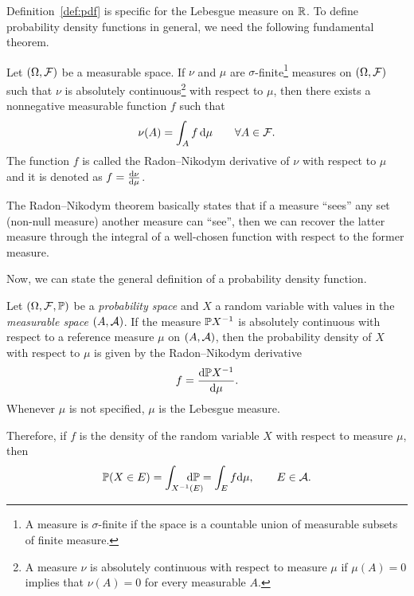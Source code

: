 Definition~\ref{def:pdf} is specific for the Lebesgue measure on $\R$. To define probability density functions in general, we need the following fundamental theorem.
%
\begin{theorem}
\label{th:radon-nikodym}
    Let $(\Omega,\cal F)$ be a measurable space. If $\nu$ and $\mu$ are $\sigma$-finite\footnote{A measure is $\sigma$-finite if the space is a countable union of measurable subsets of finite measure.} measures on $(\Omega,\cal F)$ such that $\nu$ is absolutely continuous\footnote{A measure $\nu$ is absolutely continuous with respect to measure $\mu$ if $\mu(A)=0$ implies that $\nu(A) = 0$ for every measurable $A$.} with respect to $\mu$, then there exists a nonnegative measurable function $f$ such that
    \begin{align*}
        \nu(A) = \int_A f\,\d\mu\qquad \forall A\in\cal F.
    \end{align*}
    The function $f$ is called the Radon--Nikodym derivative of $\nu$ with respect to $\mu$ and it is denoted as $f = \frac{\d\nu}{\d\mu}$.
\end{theorem}

The Radon--Nikodym theorem basically states that if a measure ``sees'' any set  (non-null measure) another measure can ``see'', then we can recover the latter measure through the integral of a well-chosen function with respect to the former measure.

Now, we can state the general definition of a probability density function.
\begin{definition} \label{def:pdf_measure}
    Let $(\Omega,\cal F,\P)$ be a \textit{probability space} and $X$ a random variable with values in the \textit{measurable space} $(A,\cal A)$.
    If the measure $\P X^{-1}$ is absolutely continuous with respect to a reference measure $\mu$ on $(A,\cal A)$, then the probability density of $X$ with respect to $\mu$ is given by the Radon--Nikodym derivative
    \begin{align*}
        f = \frac{\d\P X^{-1}}{\d\mu}.
    \end{align*}
    Whenever $\mu$ is not specified, $\mu$ is the Lebesgue measure.
\end{definition}

Therefore, if $f$ is the density of the random variable $X$ with respect to measure $\mu$, then
\begin{align*}
    \P(X\in E) = \int_{X^{-1}(E)}\hspace{-6mm}\d\P = \int_{E} f\d\mu, \qquad E\in\cal A.
\end{align*}

